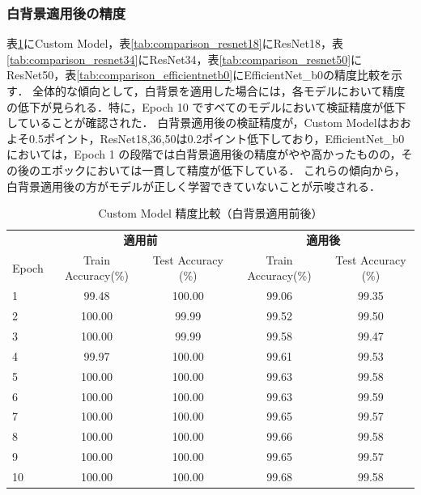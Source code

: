 \documentclass[a4paper,11pt,titlepage]{jsarticle}
\begin{document}
\subsubsection{白背景適用後の精度}

表\ref{tab:comparison_custom}にCustom Model，表\ref{tab:comparison_resnet18}にResNet18，表\ref{tab:comparison_resnet34}にResNet34，表\ref{tab:comparison_resnet50}にResNet50，表\ref{tab:comparison_efficientnetb0}にEfficientNet\_b0の精度比較を示す．
全体的な傾向として，白背景を適用した場合には，各モデルにおいて精度の低下が見られる．特に，Epoch 10 ですべてのモデルにおいて検証精度が低下していることが確認された．
白背景適用後の検証精度が，Custom Modelはおおよそ0.5ポイント，ResNet18,36,50は0.2ポイント低下しており，EfficientNet\_b0においては，Epoch 1 の段階では白背景適用後の精度がやや高かったものの，その後のエポックにおいては一貫して精度が低下している．
これらの傾向から，白背景適用後の方がモデルが正しく学習できていないことが示唆される．

\begin{table}[H]
\centering
\caption{Custom Model 精度比較（白背景適用前後）}
\label{tab:comparison_custom}
\begin{tabular}{l|cc|cc}
\hline
      & \multicolumn{2}{c|}{\textbf{適用前 }} & \multicolumn{2}{c}{\textbf{適用後 }} \\ \cline{2-5} 
Epoch & Train Accuracy(\%) & Test Accuracy (\%) & Train Accuracy(\%) & Test Accuracy (\%) \\
\hline
1     & 99.48           & 100.00               & 99.06           & 99.35                \\
2     & 100.00          & 99.99                & 99.52           & 99.50                \\
3     & 100.00          & 99.99                & 99.58           & 99.47                \\
4     & 99.97           & 100.00               & 99.61           & 99.53                \\
5     & 100.00          & 100.00               & 99.63           & 99.58                \\
6     & 100.00          & 100.00               & 99.63           & 99.59                \\
7     & 100.00          & 100.00               & 99.65           & 99.57                \\
8     & 100.00          & 100.00               & 99.66           & 99.58                \\
9     & 100.00          & 100.00               & 99.65           & 99.57                \\
10    & 100.00          & 100.00               & 99.68           & 99.58                \\
\hline
\end{tabular}
\end{table}
\end{document}

